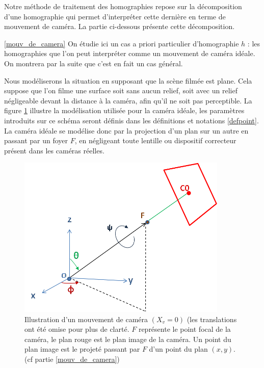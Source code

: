 Notre méthode de traitement des homographies repose sur la décomposition d'une homographie qui permet d'interpréter cette dernière en terme de mouvement de caméra. La partie ci-dessous présente cette décomposition.

\ref{mouv_de_camera}
On étudie ici un cas a priori particulier d'homographie $h$ : les homographies que l'on peut interpréter comme un mouvement de caméra idéale. On montrera par la suite que c'est en fait un cas général.

Nous modéliserons la situation en supposant que la scène filmée est plane. Cela suppose que l'on filme une surface soit sans aucun relief, soit avec un relief négligeable devant la distance à la caméra, afin qu'il ne soit pas perceptible. La figure \ref{shmdecomp} illustre la modélisation utilisée pour la caméra idéale, les paramètres introduits sur ce schéma seront définis dans les définitions et notations \ref{defpoint}. La caméra idéale se modélise donc par la projection d'un plan sur un autre en passant par un foyer $F$, en négligeant toute lentille ou dispositif correcteur présent dans les caméras réelles.
\begin{figure}[h!]

\centering
\includegraphics[width=10cm]{shema_decomp.png}
\caption{Illustration d'un mouvement de caméra $(X_v =0)$ (les translations ont été omise pour plus de clarté. $F$ représente le point focal de la caméra, le plan rouge est le plan image de la caméra. Un point du plan image est le projeté passant par $F$ d'un point du plan $(x,y)$. (cf partie \ref{mouv_de_camera})}
\label{shmdecomp}
\end{figure}

